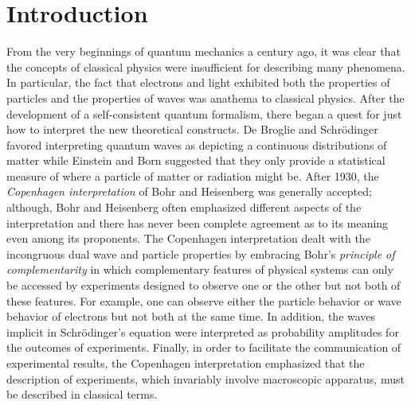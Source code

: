 \documentclass[12pt]{article}
\begin{document}
\section{Introduction}\label{INTRO}

From the very beginnings of quantum mechanics a century ago, it was clear that the concepts of classical physics were insufficient for describing many phenomena.  In particular, the fact that electrons and light exhibited both the properties of particles and the properties of waves was anathema to classical physics. After the development of a self-consistent quantum formalism, there began a quest for just how to interpret the new theoretical constructs.  De Broglie and Schr\"{o}dinger favored interpreting quantum waves as depicting a continuous distributions of matter while Einstein and Born suggested that they only provide a statistical measure of where a particle of matter or radiation might be.  After 1930, the {\it Copenhagen interpretation} of Bohr and Heisenberg was generally accepted; although, Bohr and Heisenberg often emphasized different aspects of the interpretation and there has never been complete agreement as to its meaning even among its proponents\cite{St1972}.   The Copenhagen interpretation dealt with the incongruous dual wave and particle properties by embracing Bohr's {\it principle of complementarity} in which complementary features of physical systems can only be accessed by experiments designed to observe one or the other but not both of these features.   For example, one can observe either the particle behavior or wave behavior of electrons but not both at the same time.  In addition, the waves implicit in Schr\"{o}dinger's equation were interpreted as probability amplitudes for the outcomes of experiments.  Finally, in order to facilitate the communication of experimental results, the Copenhagen interpretation emphasized that the description of experiments, which invariably involve macroscopic apparatus, must be described in classical terms.
\end{document}
